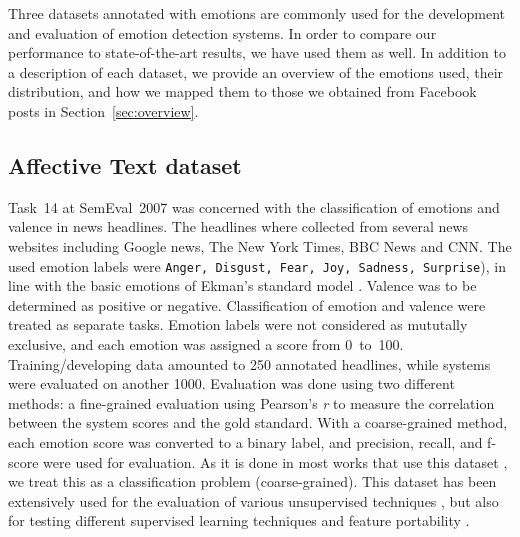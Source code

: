\documentclass[11pt]{article}
\begin{document}
Three datasets annotated with emotions are commonly used for the development and evaluation of emotion detection systems. In order to compare our performance to state-of-the-art results, we have used them as well. In addition to a description of each dataset, we provide an overview of the emotions used, their distribution, and how we mapped them to those we obtained from Facebook posts in Section~\ref{sec:overview}.

\subsection{Affective Text dataset}
\label{sec:data:affect}
Task~14 at SemEval~2007  \cite{strapparava2007semeval} was concerned with the classification of emotions and valence in news headlines. The headlines where collected from several news websites including Google news,  The New York Times, BBC News and CNN. The used emotion labels were \texttt{Anger, Disgust, Fear, Joy, Sadness, Surprise}), in line with the basic emotions of Ekman's standard model \cite{ekman1992argument}. Valence was to be determined as positive or negative. Classification of emotion and valence were treated as separate tasks. 
Emotion labels were not considered as mututally exclusive, and each emotion was assigned a score from 0~to~100. Training/developing data amounted to 250 annotated headlines, while systems were evaluated on another 1000. Evaluation was done using two different methods: a fine-grained evaluation using Pearson's \textit{r}  to measure the correlation between the system scores and the gold standard. With a coarse-grained method, each emotion score was converted to a binary label, and precision, recall, and f-score were used for evaluation. As it is done in most works that use this dataset \cite{kim2010evaluation,chaffar2011using,calvo2013emotions}, we treat this as a classification problem (coarse-grained).  This dataset has been extensively used for the evaluation of various unsupervised techniques \cite{strapparava2008learning}, but also for testing different supervised learning techniques and feature portability \cite{mohammad:2012:NAACL-HLT}.

%
%
\end{document}
